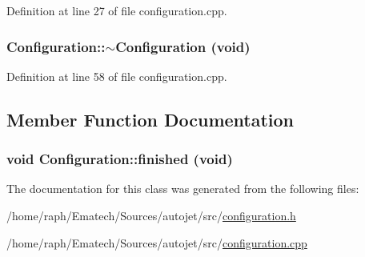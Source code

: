 Definition at line 27 of file configuration.cpp.\hypertarget{class_configuration_094b6e765719f7a801524abac5e46475}{
\subsubsection[{$\sim$Configuration}]{\setlength{\rightskip}{0pt plus 5cm}Configuration::$\sim$Configuration (void)}}
\label{class_configuration_094b6e765719f7a801524abac5e46475}




Definition at line 58 of file configuration.cpp.

\subsection{Member Function Documentation}
\hypertarget{class_configuration_84909e3f2258ba02ee1120cbbf894348}{
\subsubsection[{finished}]{\setlength{\rightskip}{0pt plus 5cm}void Configuration::finished (void)}}
\label{class_configuration_84909e3f2258ba02ee1120cbbf894348}




The documentation for this class was generated from the following files:\begin{CompactItemize}
\item 
/home/raph/Ematech/Sources/autojet/src/\hyperlink{configuration_8h}{configuration.h}\item 
/home/raph/Ematech/Sources/autojet/src/\hyperlink{configuration_8cpp}{configuration.cpp}\end{CompactItemize}

